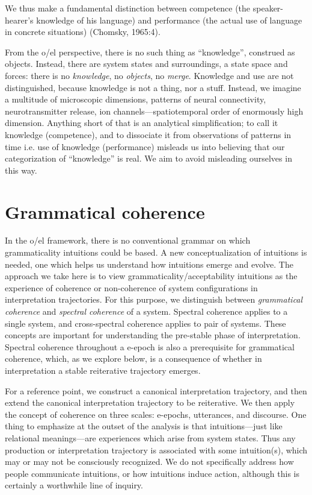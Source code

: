 We thus make a fundamental distinction between competence (the speaker-hearer's knowledge of his language) and performance (the actual use of language in concrete situations) (Chomsky, 1965:4).

  From the o/el perspective, there is no such thing as “knowledge”, construed as objects. Instead, there are system states and surroundings, a state space and forces: there is no \textit{knowledge}, no \textit{objects}, no \textit{merge}. Knowledge and use are not distinguished, because knowledge is not a thing, nor a stuff. Instead, we imagine a multitude of microscopic dimensions, patterns of neural connectivity, neurotransmitter release, ion channels—spatiotemporal order of enormously high dimension. Anything short of that is an analytical simplification; to call it knowledge (competence), and to dissociate it from observations of patterns in time i.e. use of knowledge (performance) misleads us into believing that our categorization of “knowledge” is real. We aim to avoid misleading ourselves in this way.

\section{Grammatical coherence}

In the o/el framework, there is no conventional grammar on which grammaticality intuitions could be based. A new conceptualization of intuitions is needed, one which helps us understand how intuitions emerge and evolve. The approach we take here is to view grammaticality/acceptability intuitions as the experience of coherence or non-coherence of system configurations in interpretation trajectories. For this purpose, we distinguish between \textit{grammatical coherence} and \textit{spectral coherence} of a system. Spectral coherence applies to a single system, and cross-spectral coherence applies to pair of systems. These concepts are important for understanding the pre-stable phase of interpretation. Spectral coherence throughout a e-epoch is also a prerequisite for grammatical coherence, which, as we explore below, is a consequence of whether in interpretation a stable reiterative trajectory emerges.

For a reference point, we construct a canonical interpretation trajectory, and then extend the canonical interpretation trajectory to be reiterative. We then apply the concept of coherence on three scales: e-epochs, utterances, and discourse. One thing to emphasize at the outset of the analysis is that intuitions—just like relational meanings—are experiences which arise from system states. Thus any production or interpretation trajectory is associated with some intuition(s), which may or may not be consciously recognized. We do not specifically address how people communicate intuitions, or how intuitions induce action, although this is certainly a worthwhile line of inquiry.

